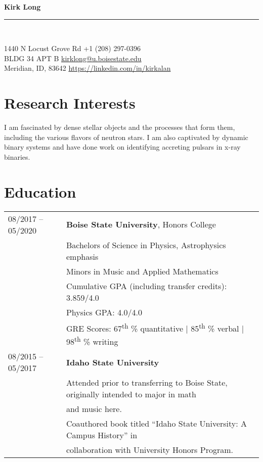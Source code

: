 \documentclass[11pt]{article}
\newcommand{\makeheading}[2]%
        {\begin{minipage}[t]{\textwidth}%
                 {\LARGE \bfseries #1} \\[-0.3\baselineskip]%
                 \rule{\columnwidth}{1.5pt}\\[0.1\baselineskip]
         \end{minipage}}
\begin{document}
\makeheading{Kirk Long}{}

1440 N Locust Grove Rd				\hfill	+1 (208) 297-0396\\
BLDG 34 APT B	\hfill	\href{mailto:kirklong@u.boisestate.edu}{kirklong@u.boisestate.edu}\\
Meridian, ID, 83642			\hfill	\url{https://linkedin.com/in/kirkalan}



\section{Research Interests}
 I am fascinated by dense stellar objects and the processes that form them, including the various flavors of neutron stars. I am also captivated by dynamic binary systems and have done work on identifying accreting pulsars in x-ray binaries.

\section{Education}
\begin{tabular}{ll}
08/2017 -- 05/2020	& 	\textbf{Boise State University}, Honors College \vspace{1mm} \\
			&	Bachelors of Science in Physics, Astrophysics emphasis\\
			&	Minors in Music and Applied Mathematics\vspace{1mm} \\
			&	Cumulative GPA (including transfer credits): 3.859/4.0\\
      & Physics GPA: 4.0/4.0\\
      & GRE Scores: 67\textsuperscript{th} \% quantitative | 85\textsuperscript{th} \% verbal | 98\textsuperscript{th} \% writing \vspace{2mm} \\
08/2015 -- 05/2017 & \textbf{Idaho State University} \vspace{1mm} \\
      & Attended prior to transferring to Boise State, originally intended to major in math\\
      & and music here.\\
      & Coauthored book titled ``Idaho State University: A Campus History'' in \\
      & collaboration with University Honors Program.\\

\end{tabular}
\end{document}
